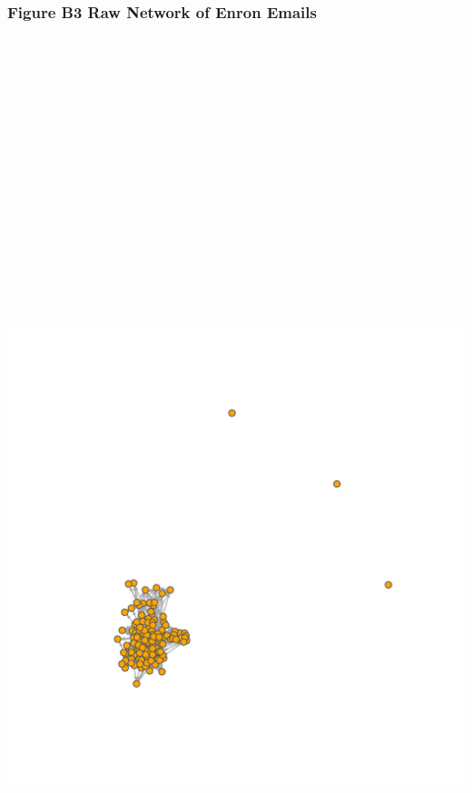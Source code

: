 \documentclass[]{article}
\begin{document}
\subsubsection{Figure B3 Raw Network of Enron
Emails}\label{figure-b3-raw-network-of-enron-emails}

\section{\texorpdfstring{\protect\includegraphics[height=12.50000in]{images/n_raw.png}}{Network of Enron Emails}}\label{network-of-enron-emails}
\end{document}
